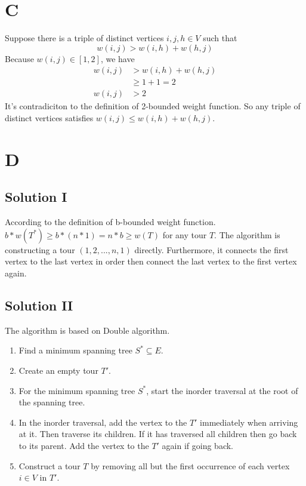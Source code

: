 \documentclass{article}
\begin{document}
\section*{C}
Suppose there is a triple of distinct vertices $i,j,h \in V$ such that
\begin{equation*}
  w(i,j) > w(i,h)+w(h,j)
\end{equation*}
Because $w(i,j) \in [1, 2]$, we have
\begin{equation*}
\begin{aligned}
  w(i,j) & >  w(i,h)+w(h,j) \\
         & \ge 1 + 1 = 2 \\
  w(i,j) & > 2
\end{aligned}
\end{equation*}
It's contradiciton to the definition of 2-bounded weight function. So any triple of distinct vertices satisfies $w(i,j) \le w(i,h) + w(h,j)$.

\section*{D}
\subsection*{Solution I}
According to the definition of b-bounded weight function. $b * w(T^*) \ge b * (n * 1) = n * b \ge w(T)$ for any tour $T$. The algorithm is constructing a tour $(1,2,...,n,1)$ directly. Furthermore, it connects the first vertex to the last vertex in order then connect the last vertex to the first vertex again.

\subsection*{Solution II}
The algorithm is based on Double algorithm.

\begin{enumerate}
  \item Find a minimum spanning tree $S^* \subseteq E$.
  \item Create an empty tour $T'$.
  \item For the minimum spanning tree $S^*$, start the inorder traversal at the root of the spanning tree.
  \item In the inorder traversal, add the vertex to the $T'$ immediately when arriving at it. Then traverse its children. If it has traversed all children then go back to its parent. Add the vertex to the $T'$ again if going back.
  \item Construct a tour $T$ by removing all but the first occurrence of each vertex $i \in V$ in $T'$.
\end{enumerate}
\end{document}
